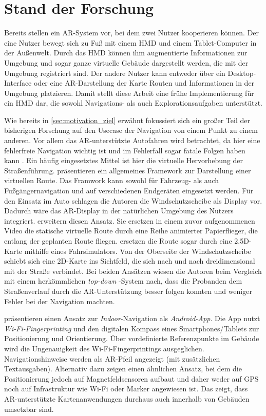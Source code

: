 \chapter{Stand der Forschung}
\label{chap:related_work}
Bereits \textcite{Hoellerer1999} stellen ein \gls{AR}-System vor, bei dem zwei Nutzer kooperieren können.
Der eine Nutzer bewegt sich zu Fuß mit einem \gls{HMD} und einem Tablet-Computer in der Außenwelt.
Durch das \gls{HMD} können ihm augmentierte Informationen zur Umgebung und sogar ganze virtuelle Gebäude dargestellt werden, die mit der Umgebung registriert sind.
Der andere Nutzer kann entweder über ein Desktop-Interface oder eine \gls{AR}-Darstellung der Karte Routen und Informationen in der Umgebung platzieren.
Damit stellt diese Arbeit eine frühe Implementierung für ein \gls{HMD} dar, die sowohl Navigations- als auch Explorationsaufgaben unterstützt.

Wie bereits in \autoref{sec:motivation_ziel} erwähnt fokussiert sich ein großer Teil der bisherigen Forschung auf den Usecase der Navigation von einem Punkt zu einem anderen.
Vor allem das \gls{AR}-unterstützte Autofahren wird betrachtet, da hier eine fehlerfreie Navigation wichtig ist und im Fehlerfall sogar fatale Folgen haben kann \parencite{Lin2017}.
Ein häufig eingesetztes Mittel ist hier die virtuelle Hervorhebung der Straßenführung.
\textcite{Narzt2006} präsentieren ein allgemeines Framework zur Darstellung einer virtuellen Route.
Das Framwork kann sowohl für Fahrzeug- als auch Fußgängernavigation und auf verschiedenen Endgeräten eingesetzt werden.
Für den Einsatz im Auto schlagen die Autoren die Windschutzscheibe als Display vor.
Dadurch wäre das AR-Display in der natürlichen Umgebung des Nutzers integriert.
\textcite{Bark2014} erweitern diesen Ansatz.
Sie ersetzen in einem zuvor aufgenommenen Video die statische virtuelle Route durch eine Reihe animierter Papierflieger, die entlang der geplanten Route fliegen.
\textcite{Kim2009} ersetzen die Route sogar durch eine 2.5D-Karte mithilfe eines Fahrsimulators.
Von der Oberseite der Windschutzscheibe schiebt sich eine 2D-Karte ins Sichtfeld, die sich nach und nach dreidimensional mit der Straße verbindet.
Bei beiden Ansätzen wiesen die Autoren beim Vergleich mit einem herkömmlichen \emph{top-down }-System nach, dass die Probanden dem Straßenverlauf durch die \gls{AR}-Unterstützung besser folgen konnten und weniger Fehler bei der Navigation machten.

\textcite{Alnabhan2014} präsentieren einen Ansatz zur \emph{Indoor}-Navigation als \emph{Android-App}.
Die App nutzt \emph{Wi-Fi-Fingerprinting} und den digitalen Kompass eines Smartphones/Tablets zur Positionierung und Orientierung.
Über vordefinierte Referenzpunkte im Gebäude wird die Ungenauigkeit des Wi-Fi-Fingerprintings ausgeglichen.
Navigationshinweise werden als \gls{AR}-Pfeil angezeigt (mit zusätzlichen Textausgaben).
Alternativ dazu zeigen \textcite{Liu2016} einen ähnlichen Ansatz, bei dem die Positionierung jedoch auf Magnetfeldsensoren aufbaut und daher weder auf \gls{GPS} noch auf Infrastruktur wie Wi-Fi oder Marker angewiesen ist.
Das zeigt, dass \gls{AR}-unterstützte Kartenanwendungen durchaus auch innerhalb von Gebäuden umsetzbar sind.


